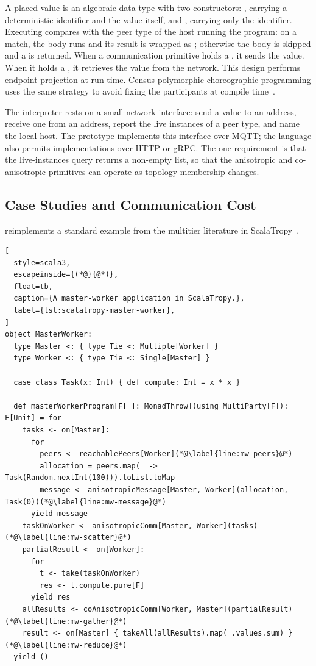 A placed value is an algebraic data type with two constructors:
, carrying a deterministic identifier and the value itself,
and , carrying only the identifier.
%
Executing  compares  with the peer type of the host running the program:
on a match, the body runs and its result is wrapped as ;
otherwise the body is skipped and a  is returned.
%
When a communication primitive holds a , it sends the value.
When it holds a , it retrieves the value from the network.
%
This design performs endpoint projection at run time.
%
Census-polymorphic choreographic programming uses the same strategy to avoid fixing the participants at compile time~\cite{DBLP:journals/pacmpl/BatesKJSKN25}.

The interpreter rests on a small network interface:
send a value to an address, receive one from an address, report the live instances of a peer type, and name the local host.
%
The prototype implements this interface over MQTT; the language also permits implementations over HTTP or gRPC.
%
The one requirement is that the live-instances query returns a non-empty list,
so that the anisotropic and co-anisotropic primitives can operate as topology membership changes.

\subsection{Case Studies and Communication Cost}
\label{subsec:scalatropy-evaluation}

 reimplements a standard example from the multitier literature in ScalaTropy~\cite{DBLP:journals/pacmpl/WeisenburgerKS18}.

\begin{lstlisting}[
  style=scala3,
  escapeinside={(*@}{@*)},
  float=tb,
  caption={A master-worker application in ScalaTropy.},
  label={lst:scalatropy-master-worker},
]
object MasterWorker:
  type Master <: { type Tie <: Multiple[Worker] }
  type Worker <: { type Tie <: Single[Master] }

  case class Task(x: Int) { def compute: Int = x * x }

  def masterWorkerProgram[F[_]: MonadThrow](using MultiParty[F]): F[Unit] = for
    tasks <- on[Master]:
      for
        peers <- reachablePeers[Worker](*@\label{line:mw-peers}@*)
        allocation = peers.map(_ -> Task(Random.nextInt(100))).toList.toMap
        message <- anisotropicMessage[Master, Worker](allocation, Task(0))(*@\label{line:mw-message}@*)
      yield message
    taskOnWorker <- anisotropicComm[Master, Worker](tasks)(*@\label{line:mw-scatter}@*)
    partialResult <- on[Worker]:
      for
        t <- take(taskOnWorker)
        res <- t.compute.pure[F]
      yield res
    allResults <- coAnisotropicComm[Worker, Master](partialResult)(*@\label{line:mw-gather}@*)
    result <- on[Master] { takeAll(allResults).map(_.values.sum) }(*@\label{line:mw-reduce}@*)
  yield ()
\end{lstlisting}

